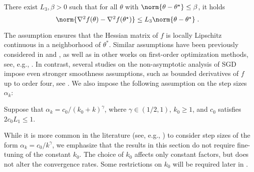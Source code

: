 \begin{assum}
\label{ass:hessian_Lipschitz_ball}
There exist  $L_3, \beta > 0$ such that for all $\theta$ with $\norm{\theta-\thetas} \leq \beta$, it holds 
\begin{equation}
\textstyle 
\norm{\nabla^2f(\theta) -\nabla^2f(\thetas)}\leq L_3\norm{\theta-\thetas}\eqsp.
\end{equation}
\end{assum} 
The assumption  ensures that the Hessian matrix of \(f\) is locally Lipschitz continuous in a neighborhood of \(\theta^*\). 
Similar assumptions have been previously considered in \cite{shao2022berry} and \cite{pmlr-v99-anastasiou19a}, as well as in other works on first-order optimization methods, see, e.g., \cite{li2022root}. In contrast, several studies on the non-asymptotic analysis of SGD impose even stronger smoothness assumptions, such as bounded derivatives of \(f\) up to order four, see \cite{durmus2020biassgd}. We also impose the following assumption on the step sizes \( \alpha_k\):

\begin{assum}
\label{ass:step_size}
Suppose that $\alpha_k = c_0 / (k_0+k)^{\gamma}$, where $\gamma \in (1/2, 1)$, $k_0\geq 1$, and $c_0$ satisfies $2c_0L_1\leq 1$.
\end{assum}

While it is more common in the literature (see, e.g., \cite{polyak1992acceleration}) to consider step sizes of the form $\alpha_k = c_0 / k^{\gamma}$, we emphasize that the results in this section do not require fine-tuning of the constant $k_0$. The choice of $k_0$ affects only constant factors, but does not alter the convergence rates. Some restrictions on $k_0$ will be required later in . 


